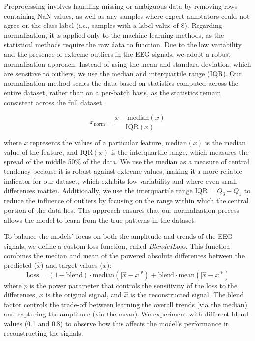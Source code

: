 Preprocessing involves handling missing or ambiguous data by removing rows containing NaN values, as well as any samples where expert annotators could not agree on the class label (i.e., samples with a label value of 8). Regarding normalization, it is applied only to the machine learning methods, as the statistical methods require the raw data to function. Due to the low variability and the presence of extreme outliers in the EEG signals, we adopt a robust normalization approach. Instead of using the mean and standard deviation, which are sensitive to outliers, we use the median and interquartile range (IQR). Our normalization method scales the data based on statistics computed across the entire dataset, rather than on a per-batch basis, as the statistics remain consistent across the full dataset.

\begin{equation}
    x_{\text{norm}} = \frac{x - \text{median}(x)}{\text{IQR}(x)} \label{eq:robust_norm}
\end{equation}

where $x$ represents the values of a particular feature, $\text{median}(x)$ is the median value of the feature, and $\text{IQR}(x)$ is the interquartile range, which measures the spread of the middle 50\% of the data. We use the median as a measure of central tendency because it is robust against extreme values, making it a more reliable indicator for our dataset, which exhibits low variability and where even small differences matter. Additionally, we use the interquartile range $\text{IQR} = Q_3 - Q_1$ to reduce the influence of outliers by focusing on the range within which the central portion of the data lies. This approach ensures that our normalization process allows the model to learn from the true patterns in the dataset.

To balance the models' focus on both the amplitude and trends of the EEG signals, we define a custom loss function, called \emph{BlendedLoss}. This function combines the median and mean of the powered absolute differences between the predicted ($\hat{x}$) and target values ($x$):
%
\begin{equation}
\text{Loss} = (1 - \text{blend}) \cdot \text{median}(\lvert \hat{x} - x \rvert^p) + \text{blend} \cdot \text{mean}(\lvert \hat{x} - x \rvert^p)
\end{equation}
%
where $p$ is the power parameter that controls the sensitivity of the loss to the differences, $x$ is the original signal, and $\hat{x}$ is the reconstructed signal. The blend factor controls the trade-off between learning the overall trends (via the median) and capturing the amplitude (via the mean). We experiment with different blend values (0.1 and 0.8) to observe how this affects the model’s performance in reconstructing the signals.

